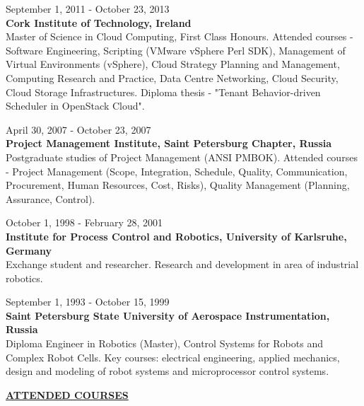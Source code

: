 \documentclass[a4paper,12pt,]{article}
\begin{document}
  \begin{description}

  \item{ September 1, 2011 - October 23, 2013 \bfseries \\ 
	  Cork Institute of Technology, Ireland}\\
  Master of Science in Cloud Computing, First Class Honours. Attended courses - Software Engineering, Scripting (VMware vSphere Perl SDK), Management of Virtual Environments (vSphere), Cloud Strategy Planning and Management, Computing Research and Practice, Data Centre Networking, Cloud Security, Cloud Storage Infrastructures. Diploma thesis - "Tenant Behavior-driven Scheduler in OpenStack Cloud".

  \item{ April 30, 2007 - October 23, 2007 \bfseries \\
    Project Management Institute, Saint Petersburg Chapter, Russia} \\
  Postgraduate studies of Project Management (ANSI PMBOK). Attended courses -
  Project Management (Scope, Integration, Schedule, Quality, Communication, Procurement,
  Human Resources, Cost, Risks), Quality Management (Planning, Assurance, Control). 

  \item{ October 1, 1998 - February 28, 2001 \bfseries \\
    Institute for Process Control and Robotics, University of Karlsruhe, Germany} \\
  Exchange student and researcher. Research and development in area of industrial robotics.

  \item{ September 1, 1993 - October 15, 1999 \bfseries \\
    Saint Petersburg State University of Aerospace Instrumentation, Russia} \\
  Diploma Engineer in Robotics (Master), Control Systems for Robots and Complex Robot Cells. 
  Key courses: electrical engineering, applied mechanics, design and modeling of robot 
  systems and microprocessor control systems.

  \end{description}

  \vspace{1ex}

  \uline{ \bfseries{ATTENDED COURSES} }
\end{document}
